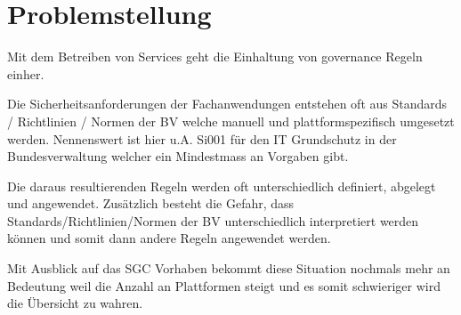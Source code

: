 \section{Problemstellung}

Mit dem Betreiben von Services geht die Einhaltung von governance Regeln einher.

Die Sicherheitsanforderungen der Fachanwendungen entstehen oft aus Standards / Richtlinien / Normen der BV welche manuell und plattformspezifisch umgesetzt werden.
Nennenswert ist hier u.A. Si001 für den IT Grundschutz in der Bundesverwaltung welcher ein Mindestmass an Vorgaben gibt.

Die daraus resultierenden Regeln werden oft unterschiedlich definiert, abgelegt und angewendet.
Zusätzlich besteht die Gefahr, dass Standards/Richtlinien/Normen der BV unterschiedlich interpretiert werden können und somit dann andere Regeln angewendet werden.

Mit Ausblick auf das SGC Vorhaben bekommt diese Situation nochmals mehr an Bedeutung weil die Anzahl an Plattformen steigt und es somit schwieriger wird die Übersicht zu wahren.